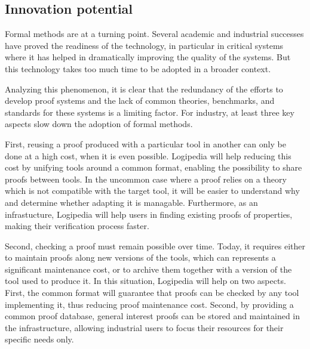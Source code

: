 \subsection{Innovation potential}


Formal methods are at a turning point. Several academic and
industrial successes have proved the readiness of the technology,
in particular in critical systems where it has helped in
dramatically improving the quality of the systems. But this
technology takes too much time to be adopted in a broader context.

Analyzing this phenomenon, it is clear that the redundancy of the
efforts to develop proof systems and the lack of common theories,
benchmarks, and standards for these systems is a limiting factor.
For industry, at least three key aspects slow down the adoption of
formal methods.

First, reusing a proof produced with a particular tool in another
can only be done at a high cost, when it is even possible.
{\sf Logipedia} will help reducing this cost by unifying tools
around a common format, enabling the possibility to share proofs
between tools. In the uncommon case where a proof relies on a theory
which is not compatible with the target tool, it will be easier to
understand why and determine whether adapting it is managable.
Furthermore, as an infrastucture, {\sf Logipedia} will help users
in finding existing proofs of properties, making their verification
process faster.

Second, checking a proof must remain possible over time. Today, it
requires either to maintain proofs along new versions of the tools,
which can represents a significant maintenance cost, or to archive
them together with a version of the tool used to produce it. In this
situation, {\sf Logipedia} will help on two aspects. First, the
common format will guarantee that proofs can be checked by any tool
implementing it, thus reducing proof maintenance cost. Second, by
providing a common proof database, general interest proofs can be
stored and maintained in the infrastructure, allowing industrial users
to focus their resources for their specific needs only.

